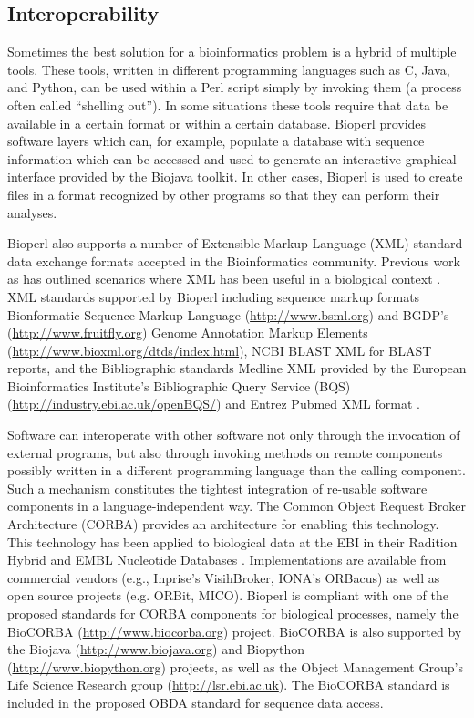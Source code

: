 \documentclass[12pt]{article}
\begin{document}
\subsection{Interoperability}

Sometimes the best solution for a bioinformatics problem is a hybrid
of multiple tools.  These tools, written in different programming
languages such as C, Java, and Python, can be used within a Perl
script simply by invoking them (a process often called ``shelling
out'').  In some situations these tools require that data be available
in a certain format or within a certain database.  Bioperl provides
software layers which can, for example, populate a database with
sequence information which can be accessed and used to generate an
interactive graphical interface provided by the Biojava toolkit.
In other cases, Bioperl is used to create files in a format recognized
by other programs so that they can perform their analyses. 

Bioperl also supports a number of Extensible Markup Language (XML) 
standard data exchange formats accepted in the Bioinformatics
community.  Previous work as has outlined scenarios
where XML has been useful in a biological context
\cite{xmlbioinformatics}.  XML standards supported by Bioperl
including sequence markup formats Bionformatic Sequence Markup
Language (\url{http://www.bsml.org}) and BGDP's
(\url{http://www.fruitfly.org}) Genome Annotation Markup Elements
(\url{http://www.bioxml.org/dtds/index.html}), NCBI BLAST XML for
BLAST reports, and the Bibliographic standards Medline XML provided
by the European Bioinformatics Institute's Bibliographic 
Query Service (BQS) (\url{http://industry.ebi.ac.uk/openBQS/}) and 
Entrez Pubmed XML format \cite{entrez}.

Software can interoperate with other software not only through the
invocation of external programs, but also through invoking methods on
remote components possibly written in a different programming language
than the calling component.  Such a mechanism constitutes the tightest
integration of re-usable software components in a language-independent
way.  The Common Object Request Broker Architecture (CORBA)
\cite{corba} provides an architecture for enabling this technology.
This technology has been applied to biological data at the EBI in
their Radition Hybrid \cite{rhdb} and EMBL Nucleotide
Databases \cite{embl-corba}. Implementations are
available from commercial vendors (e.g., Inprise's VisihBroker, IONA's
ORBacus) as well as open source projects (e.g. ORBit, MICO).  Bioperl
is compliant with one of the proposed standards for CORBA components
for biological processes, namely the BioCORBA
(\url{http://www.biocorba.org}) project.  BioCORBA is also supported
by the Biojava (\url{http://www.biojava.org}) and Biopython
(\url{http://www.biopython.org}) projects, as well as the Object
Management Group's Life Science Research group
(\url{http://lsr.ebi.ac.uk}).  The BioCORBA standard is included in
the proposed OBDA standard for sequence data access.
\end{document}
